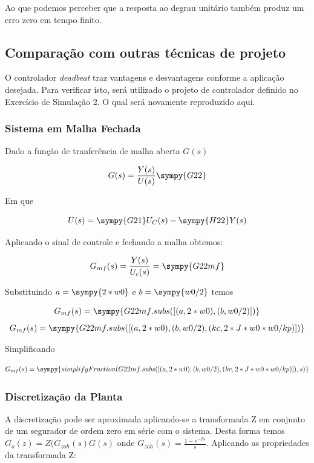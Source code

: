 \documentclass[a4paper,11pt]{article}
\begin{document}
Ao que podemos perceber que a resposta ao degrau unitário também produz um erro zero em tempo finito.

\subsection{Comparação com outras técnicas de projeto}

O controlador \textit{deadbeat} traz vantagens e desvantagens conforme a aplicação desejada. Para verificar isto, será utilizado o projeto de controlador definido no Exercício de Simulação 2. O qual será novamente reproduzido aqui.

\subsubsection{Sistema em Malha Fechada}

Dado a função de tranferência de malha aberta $G(s)$

\begin{equation}
    G(s) = \frac{Y(s)}{U(s)} \sympy{G22}
\end{equation}

Em que

\begin{equation}
    U(s) = \sympy{G21}U_C(s) - \sympy{H22}Y(s)
\end{equation}

Aplicando o sinal de controle e fechando a malha obtemos:

$$G_{mf}(s) = \frac{Y(s)}{U_c(s)} = \sympy{G22mf}$$

Substituindo $a = \sympy{2*w0}$ e $b = \sympy{w0/2}$ temos

$$
G_{mf}(s) = \sympy{G22mf.subs([(a,2*w0),(b,w0/2)])}
$$
$$
G_{mf}(s) = \sympy{G22mf.subs([(a,2*w0),(b,w0/2),(kc,2*J*w0*w0/kp)])}
$$

Simplificando

\begin{equation}
    G_{mf}(s) = \sympy{simplifyFraction(G22mf.subs([(a,2*w0),(b,w0/2),(kc,2*J*w0*w0/kp)]),s)}
\end{equation}

\subsubsection{Discretização da Planta}

A discretização pode ser aproximada aplicando-se a transformada Z em conjunto de um segurador de ordem zero em série com o sistema. Desta forma temos $G_o(z) = Z(G_{zoh}(s)G(s)$ onde $G_{zoh}(s) = \frac{1-e^{-Ts}}{s}$. Aplicando as propriedades da transformada Z:
\end{document}

